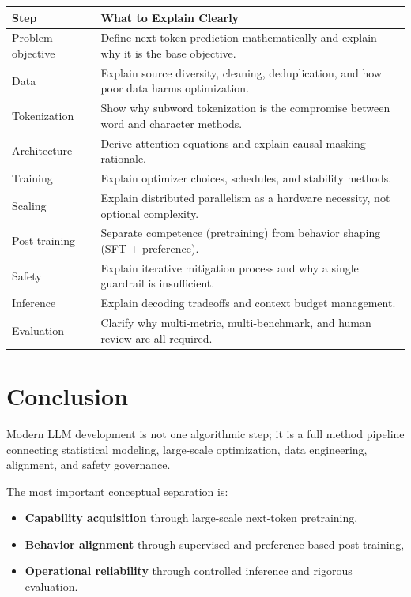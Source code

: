 \documentclass[12pt]{article}
\begin{document}
\begin{longtable}{>{\raggedright\arraybackslash}p{} >{\raggedright\arraybackslash}p{}}
\toprule
\textbf{Step} & \textbf{What to Explain Clearly} \\
\midrule
Problem objective & Define next-token prediction mathematically and explain why it is the base objective. \\
Data & Explain source diversity, cleaning, deduplication, and how poor data harms optimization. \\
Tokenization & Show why subword tokenization is the compromise between word and character methods. \\
Architecture & Derive attention equations and explain causal masking rationale. \\
Training & Explain optimizer choices, schedules, and stability methods. \\
Scaling & Explain distributed parallelism as a hardware necessity, not optional complexity. \\
Post-training & Separate competence (pretraining) from behavior shaping (SFT + preference). \\
Safety & Explain iterative mitigation process and why a single guardrail is insufficient. \\
Inference & Explain decoding tradeoffs and context budget management. \\
Evaluation & Clarify why multi-metric, multi-benchmark, and human review are all required. \\
\bottomrule
\end{longtable}

\section{Conclusion}

Modern LLM development is not one algorithmic step; it is a full method pipeline connecting statistical modeling, large-scale optimization, data engineering, alignment, and safety governance.

The most important conceptual separation is:
\begin{itemize}
    \item \textbf{Capability acquisition} through large-scale next-token pretraining,
    \item \textbf{Behavior alignment} through supervised and preference-based post-training,
    \item \textbf{Operational reliability} through controlled inference and rigorous evaluation.
\end{itemize}
\end{document}
